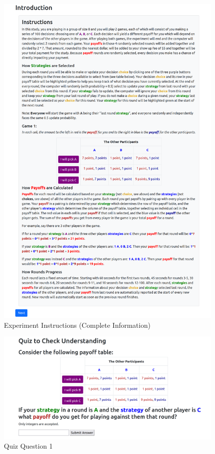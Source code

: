 \begin{figure}[h]
\captionsetup{justification=centering}
  \caption{Experiment Instructions (Complete Information)}
   \label{fig:Instructions}
    \includegraphics[width = .9\textwidth]{Images/Instructions.png}
\end{figure}

\begin{figure}[h]
\captionsetup{justification=centering}
  \caption{Quiz Question 1}
   \label{fig:QuizQ1}
    \includegraphics[width = \textwidth]{Images/Q1.png}
\end{figure}

